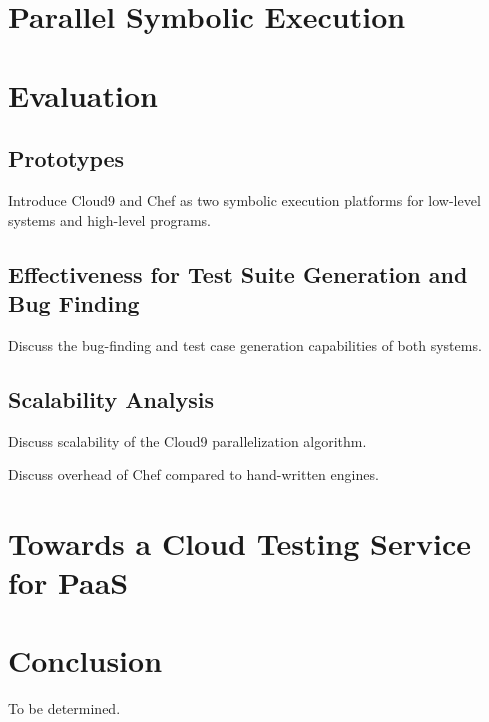 \documentclass[letterpaper,10pt,oneside]{book}
\begin{document}
\chapter{Parallel Symbolic Execution}
\label{ch:parsymbex}



\chapter{Evaluation}
\label{ch:evaluation}


\section{Prototypes}

Introduce Cloud9 and Chef as two symbolic execution platforms for low-level systems and high-level programs.

\section{Effectiveness for Test Suite Generation and Bug Finding}

Discuss the bug-finding and test case generation capabilities of both systems.

\section{Scalability Analysis}

Discuss scalability of the Cloud9 parallelization algorithm.

Discuss overhead of Chef compared to hand-written engines.


\chapter{Towards a Cloud Testing Service for PaaS}
\label{ch:paas}



\chapter{Conclusion}
\label{ch:conclusion}

To be determined.



\end{document}
